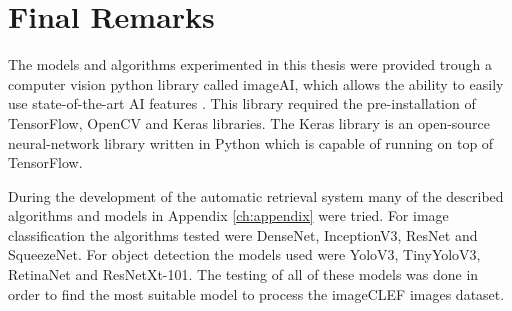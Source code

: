 \section{Final Remarks}


The models and algorithms experimented in this thesis were provided trough a computer vision python library called imageAI, which allows the ability to easily use state-of-the-art AI features \cite{ImageAI}. This library required the pre-installation of TensorFlow, OpenCV and Keras libraries. The Keras library \cite{CholletFrancois2015} is an open-source neural-network library written in Python which is capable of running on top of TensorFlow.

During the development of the automatic retrieval system many of the described algorithms and models in Appendix \ref{ch:appendix} were tried. For image classification the algorithms tested were DenseNet, InceptionV3, ResNet and SqueezeNet. For object detection the models used were YoloV3, TinyYoloV3, RetinaNet and ResNetXt-101. The testing of all of these models was done in order to find the most suitable model to process the imageCLEF images dataset.